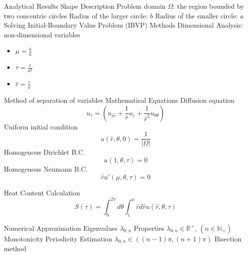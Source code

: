 \documentclass{article}
\begin{document}
\begin{outline}[enumerate]
  \newpage

  
  
  \1 Analytical Results
    \2 Shape Description
      \3 Problem domain $\Omega$: the region bounded by two concentric circles
      \3 Radius of the larger circle: $b$
      \3 Radius of the smaller circle: $a$
    \2 Solving Initial-Boundary Value Problem (IBVP)
      \3 Methods
        \4 Dimensional Analysis: non-dimensional variables
          \begin{itemize}
            \item $\mu = \frac{b}{a}$
            \item $\tau = \frac{t}{a^2}$
            \item $\hat r = \frac{r}{a}$
          \end{itemize}
        \4 Method of separation of variables
     \3 Mathematical Equations
       \4 Diffusion equation
       \begin{equation}\label{eq:DA_polar_diffusion}
         u_\tau = (u_{\hat r \hat r} + \frac{1}{\hat r} u_{\hat r} + \frac{1}{\hat r ^2} u_{\theta\theta})
       \end{equation}
       \4 Uniform initial condition
       \begin{equation}\label{eq:DA_initial_bc}
         u(\hat r, \theta, 0) = \frac{1}{|\Omega|}
       \end{equation}
       \4 Homogenous Dirichlet B.C.
       \begin{equation}\label{eq:DA_Dirichlet_bc}
         u(1, \theta, \tau) = 0
       \end{equation}
       \4 Homogenous Neumann B.C.
       \begin{equation}\label{eq:DA_Neumann_bc}
         \hat r u'(\mu, \theta, \tau) = 0
       \end{equation}
       
    \2 Heat Content Calculation
      \begin{equation}\label{eq:heat_content_annulus}
        S(\tau) = \int_{0}^{2\pi} d\theta \int_{1}^{\mu} \hat r d \hat r u(\hat r, \theta, \tau)
      \end{equation}
    
  \1 Numerical Approximation
    \2 Eigenvalues $\lambda_{0, n}$
      \3 Properties
        \4 $\lambda_{0, n} \in \mathbb{R^{+}}$, $(n \in \mathbb{N}_{+})$
        \4 Monotonicity 
        \4 Periodicity
      \3 Estimation
        \4 $\lambda_{0, n} \in ((n-1) \pi, (n+1) \pi)$ \cite{NIST:DLMF}
        \4 Bisection method \cite{2020SciPy-NMeth}


\end{outline}
\end{document}
